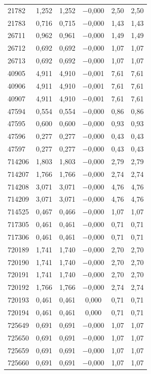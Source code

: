 \begin{longtable}{lccccc}
21782 & 1,252 & 1,252 & $-$0,000 & 2,50 & 2,50 \\
21783 & 0,716 & 0,715 & $-$0,000 & 1,43 & 1,43 \\
26711 & 0,962 & 0,961 & $-$0,000 & 1,49 & 1,49 \\
26712 & 0,692 & 0,692 & $-$0,000 & 1,07 & 1,07 \\
26713 & 0,692 & 0,692 & $-$0,000 & 1,07 & 1,07 \\
40905 & 4,911 & 4,910 & $-$0,001 & 7,61 & 7,61 \\
40906 & 4,911 & 4,910 & $-$0,001 & 7,61 & 7,61 \\
40907 & 4,911 & 4,910 & $-$0,001 & 7,61 & 7,61 \\
47594 & 0,554 & 0,554 & $-$0,000 & 0,86 & 0,86 \\
47595 & 0,600 & 0,600 & $-$0,000 & 0,93 & 0,93 \\
47596 & 0,277 & 0,277 & $-$0,000 & 0,43 & 0,43 \\
47597 & 0,277 & 0,277 & $-$0,000 & 0,43 & 0,43 \\
714206 & 1,803 & 1,803 & $-$0,000 & 2,79 & 2,79 \\
714207 & 1,766 & 1,766 & $-$0,000 & 2,74 & 2,74 \\
714208 & 3,071 & 3,071 & $-$0,000 & 4,76 & 4,76 \\
714209 & 3,071 & 3,071 & $-$0,000 & 4,76 & 4,76 \\
714525 & 0,467 & 0,466 & $-$0,000 & 1,07 & 1,07 \\
717305 & 0,461 & 0,461 & $-$0,000 & 0,71 & 0,71 \\
717306 & 0,461 & 0,461 & $-$0,000 & 0,71 & 0,71 \\
720189 & 1,741 & 1,740 & $-$0,000 & 2,70 & 2,70 \\
720190 & 1,741 & 1,740 & $-$0,000 & 2,70 & 2,70 \\
720191 & 1,741 & 1,740 & $-$0,000 & 2,70 & 2,70 \\
720192 & 1,766 & 1,766 & $-$0,000 & 2,74 & 2,74 \\
720193 & 0,461 & 0,461 & 0,000 & 0,71 & 0,71 \\
720194 & 0,461 & 0,461 & 0,000 & 0,71 & 0,71 \\
725649 & 0,691 & 0,691 & $-$0,000 & 1,07 & 1,07 \\
725650 & 0,691 & 0,691 & $-$0,000 & 1,07 & 1,07 \\
725659 & 0,691 & 0,691 & $-$0,000 & 1,07 & 1,07 \\
725660 & 0,691 & 0,691 & $-$0,000 & 1,07 & 1,07 \\

\end{longtable}
